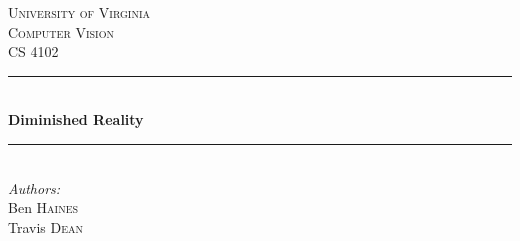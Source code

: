 \documentclass[12pt]{article}
\begin{document}
\begin{titlepage}

\newcommand{\HRule}{\rule{\linewidth}{0.5mm}} %

\center %
 

\textsc{\LARGE University of Virginia}\\[1.5cm] %
\textsc{\Large Computer Vision}\\[0.5cm] %
\textsc{\large CS 4102}\\[0.5cm] %


\HRule \\[0.4cm]
{ \huge \bfseries Diminished Reality}\\[0.4cm] %
\HRule \\[1.5cm]
 


\Large \emph{Authors:}\\
Ben \textsc{Haines}\\ %
Travis \textsc{Dean}\\[3cm] %


\end{titlepage}
\end{document}
